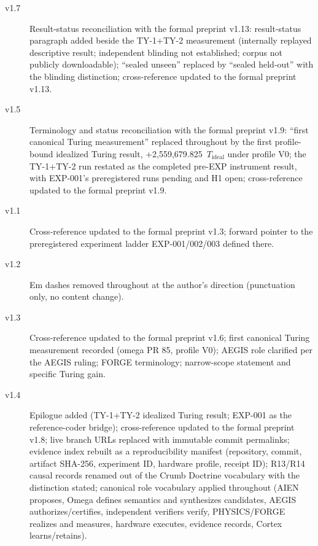 \documentclass[11pt]{article}
\begin{document}
\begin{description}
\item[v1.7] Result-status reconciliation with the formal preprint v1.13: result-status paragraph added beside the TY-1+TY-2 measurement (internally replayed descriptive result; independent blinding not established; corpus not publicly downloadable); ``sealed unseen'' replaced by ``sealed held-out'' with the blinding distinction; cross-reference updated to the formal preprint v1.13.
\item[v1.5] Terminology and status reconciliation with the formal preprint v1.9: ``first canonical Turing measurement'' replaced throughout by the first profile-bound idealized Turing result, +2,559,679.825~\(T_{\mathrm{ideal}}\) under profile V0; the TY-1+TY-2 run restated as the completed pre-EXP instrument result, with EXP-001's preregistered runs pending and H1 open; cross-reference updated to the formal preprint v1.9.
\item[v1.1] Cross-reference updated to the formal preprint v1.3; forward pointer to the preregistered experiment ladder EXP-001/002/003 defined there.
\item[v1.2] Em dashes removed throughout at the author's direction (punctuation only, no content change).
\item[v1.3] Cross-reference updated to the formal preprint v1.6; first canonical Turing measurement recorded (omega PR 85, profile V0); AEGIS role clarified per the AEGIS ruling; FORGE terminology; narrow-scope statement and specific Turing gain.
\item[v1.4] Epilogue added (TY-1+TY-2 idealized Turing result; EXP-001 as the reference-coder bridge); cross-reference updated to the formal preprint v1.8; live branch URLs replaced with immutable commit permalinks; evidence index rebuilt as a reproducibility manifest (repository, commit, artifact SHA-256, experiment ID, hardware profile, receipt ID); R13/R14 causal records renamed out of the Crumb Doctrine vocabulary with the distinction stated; canonical role vocabulary applied throughout (AIEN proposes, Omega defines semantics and synthesizes candidates, AEGIS authorizes/certifies, independent verifiers verify, PHYSICS/FORGE realizes and measures, hardware executes, evidence records, Cortex learns/retains).
\end{description}
\end{document}
